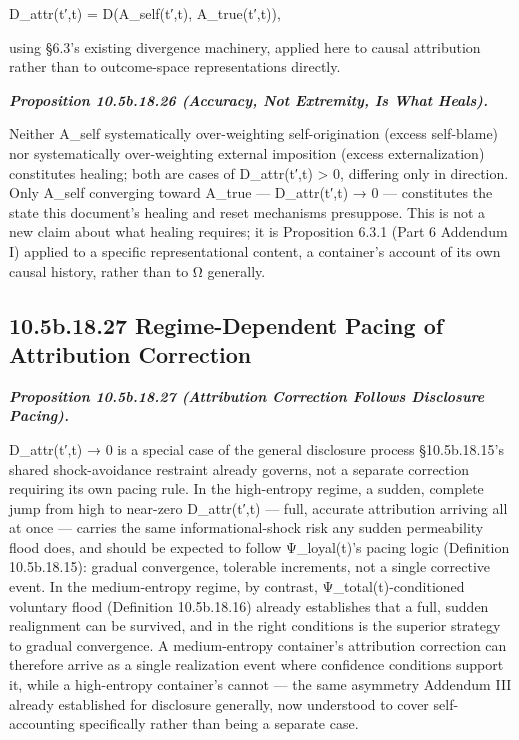 \documentclass[
]{article}
\begin{document}
D\_attr(t′,t) = D(A\_self(t′,t), A\_true(t′,t)),

using §6.3's existing divergence machinery, applied here to causal
attribution rather than to outcome-space representations directly.

\emph{\textbf{Proposition 10.5b.18.26 (Accuracy, Not Extremity, Is What
Heals).}}

Neither A\_self systematically over-weighting self-origination (excess
self-blame) nor systematically over-weighting external imposition
(excess externalization) constitutes healing; both are cases of
D\_attr(t′,t) \textgreater{} 0, differing only in direction. Only
A\_self converging toward A\_true --- D\_attr(t′,t) → 0 --- constitutes
the state this document's healing and reset mechanisms presuppose. This
is not a new claim about what healing requires; it is Proposition 6.3.1
(Part 6 Addendum I) applied to a specific representational content, a
container's account of its own causal history, rather than to Ω
generally.

\hypertarget{b.18.27-regime-dependent-pacing-of-attribution-correction}{%
\subsection{10.5b.18.27 Regime-Dependent Pacing of Attribution
Correction}\label{b.18.27-regime-dependent-pacing-of-attribution-correction}}

\emph{\textbf{Proposition 10.5b.18.27 (Attribution Correction Follows
Disclosure Pacing).}}

D\_attr(t′,t) → 0 is a special case of the general disclosure process
§10.5b.18.15's shared shock-avoidance restraint already governs, not a
separate correction requiring its own pacing rule. In the high-entropy
regime, a sudden, complete jump from high to near-zero D\_attr(t′,t) ---
full, accurate attribution arriving all at once --- carries the same
informational-shock risk any sudden permeability flood does, and should
be expected to follow Ψ\_loyal(t)'s pacing logic (Definition
10.5b.18.15): gradual convergence, tolerable increments, not a single
corrective event. In the medium-entropy regime, by contrast,
Ψ\_total(t)-conditioned voluntary flood (Definition 10.5b.18.16) already
establishes that a full, sudden realignment can be survived, and in the
right conditions is the superior strategy to gradual convergence. A
medium-entropy container's attribution correction can therefore arrive
as a single realization event where confidence conditions support it,
while a high-entropy container's cannot --- the same asymmetry Addendum
III already established for disclosure generally, now understood to
cover self-accounting specifically rather than being a separate case.
\end{document}

